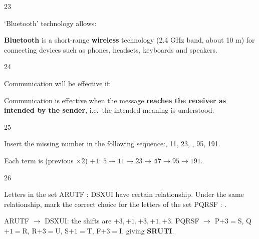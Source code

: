 \begin{question}{23}
{`Bluetooth' technology allows:\par}
\begin{explain}
\textbf{Bluetooth} is a short-range \textbf{wireless} technology (2.4 GHz band, about 10 m) for connecting devices such as phones, headsets, keyboards and speakers.
\end{explain}
\end{question}

\begin{question}{24}
{Communication will be effective if:\par}
\begin{explain}
Communication is effective when the message \textbf{reaches the receiver as intended by the sender}, i.e.\ the intended meaning is understood.
\end{explain}
\end{question}

\begin{question}{25}
{Insert the missing number in the following sequence:, 11, 23, \blank{}, 95, 191.\par}
\begin{explain}
Each term is (previous $\times2$) $+1$: $5\rightarrow11\rightarrow23\rightarrow\mathbf{47}\rightarrow95\rightarrow191$.
\end{explain}
\end{question}

\begin{question}{26}
{Letters in the set ARUTF : DSXUI have certain relationship. Under the same relationship, mark the correct choice for the letters of the set PQRSF : \blank{}.\par}
\begin{explain}
ARUTF $\rightarrow$ DSXUI: the shifts are $+3, +1, +3, +1, +3$.
PQRSF $\rightarrow$ P$+3=$S, Q$+1=$R, R$+3=$U, S$+1=$T, F$+3=$I, giving \textbf{SRUTI}.
\end{explain}
\end{question}

